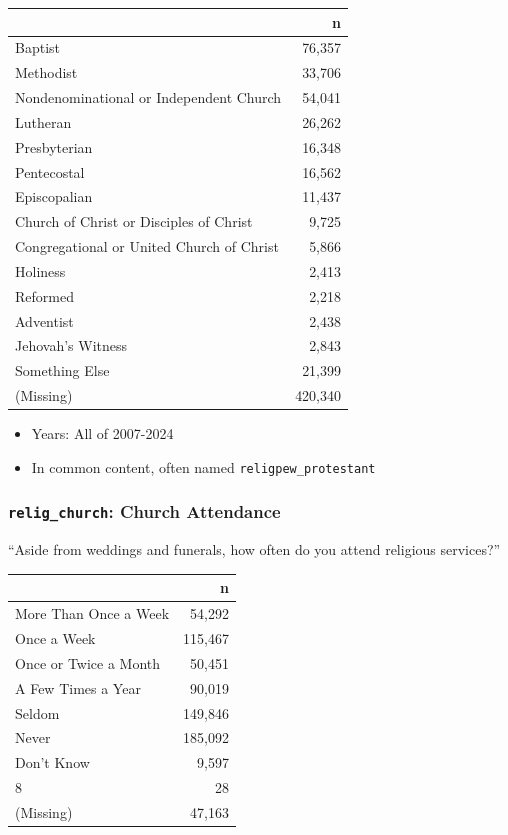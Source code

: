 \documentclass[10pt,article,oneside]{memoir}
\begin{document}
\begin{table}[H]
\centering
\begin{tabular}[t]{lr}
\toprule
 & n\\
\midrule
Baptist & 76,357\\
Methodist & 33,706\\
Nondenominational or Independent Church & 54,041\\
Lutheran & 26,262\\
Presbyterian & 16,348\\
Pentecostal & 16,562\\
Episcopalian & 11,437\\
Church of Christ or Disciples of Christ & 9,725\\
Congregational or United Church of Christ & 5,866\\
Holiness & 2,413\\
Reformed & 2,218\\
Adventist & 2,438\\
Jehovah's Witness & 2,843\\
Something Else & 21,399\\
(Missing) & 420,340\\
\bottomrule
\end{tabular}
\end{table}

\begin{itemize}
\tightlist
\item
  Years: All of 2007-2024
\item
  In common content, often named \texttt{religpew\_protestant}
\end{itemize}

\subsubsection{\texorpdfstring{\texttt{relig\_church}: Church
Attendance}{relig\_church: Church Attendance}}\label{relig_church-church-attendance}

``Aside from weddings and funerals, how often do you attend religious
services?''

\begin{table}[H]
\centering
\begin{tabular}[t]{lr}
\toprule
 & n\\
\midrule
More Than Once a Week & 54,292\\
Once a Week & 115,467\\
Once or Twice a Month & 50,451\\
A Few Times a Year & 90,019\\
Seldom & 149,846\\
Never & 185,092\\
Don't Know & 9,597\\
8 & 28\\
(Missing) & 47,163\\
\bottomrule
\end{tabular}
\end{table}
\end{document}

